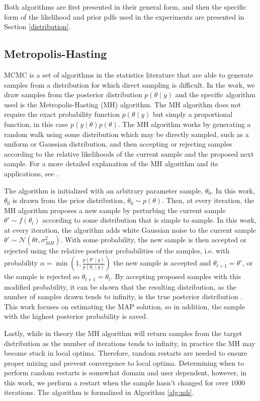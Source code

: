 Both algorithms are first presented in their general form, and then the specific form of the likelihood and prior pdfs used in the experiments are presented in Section \ref{distribution}.

\subsection{Metropolis-Hasting}
MCMC is a set of algorithms in the statistics literature that are able to generate samples from a distribution for which direct sampling is difficult. In the work, we draw samples from the posterior distribution $p(\theta \mid y)$ and the specific algorithm used is the Metropolis-Hasting (MH) algorithm. The MH algorithm does not require the exact probability function $p(\theta \mid y)$ but simply a proportional function, in this case $p(y \mid \theta)p(\theta)$. 
The MH algorithm works by generating a random walk using some distribution which may be directly sampled, such as a uniform or Gaussian distribution, and then accepting or rejecting samples according to the relative likelihoods of the current sample and the proposed next sample.
For a more detailed explanation of the MH algorithm and its applications, see \cite{chib1995understanding}. 

The algorithm is initialized with an arbitrary parameter sample, $\theta_0$. In this work, $\theta_0$ is drawn from the prior distribution, $\theta_0 \sim p(\theta)$. Then, at every iteration, the MH algorithm proposes a new sample by perturbing the current sample $\theta' \sim f(\theta_{i})$ according to some distribution that is simple to sample. 
In this work, at every iteration, the algorithm adds white Gaussian noise to the current sample $\theta' \sim \mathcal{N}(\theta{t},\sigma_{MH}^2)$. With some probability, the new sample is then accepted or rejected using the relative posterior probabilities of the samples, i.e. with probability $\alpha = \min\left(1, \frac{p(\theta' \mid y)}{p(\theta_{t} \mid y)}\right)$ the new sample is accepted and $\theta_{t+1} = \theta'$, or the sample is rejected so $\theta_{t+1} = \theta_t$. By accepting proposed samples with this modified probability, it can be shown that the resulting distribution, as the number of samples drawn tends to infinity, is the true posterior distribution \cite{chib1995understanding}.
This work focuses on estimating the MAP solution, so in addition, the sample with the highest posterior probability is saved.

Lastly, while in theory the MH algorithm will return samples from the target distribution as the number of iterations tends to infinity, in practice %
the MH may become stuck in local optima. Therefore, random restarts are needed to ensure proper mixing and prevent convergence to local optima. Determining when to perform random restarts is somewhat domain and user dependent, however, in this work, we perform a restart when the sample hasn't changed for over $1000$ iterations.
The algorithm is formalized in Algorithm \ref{alg:mh}.

